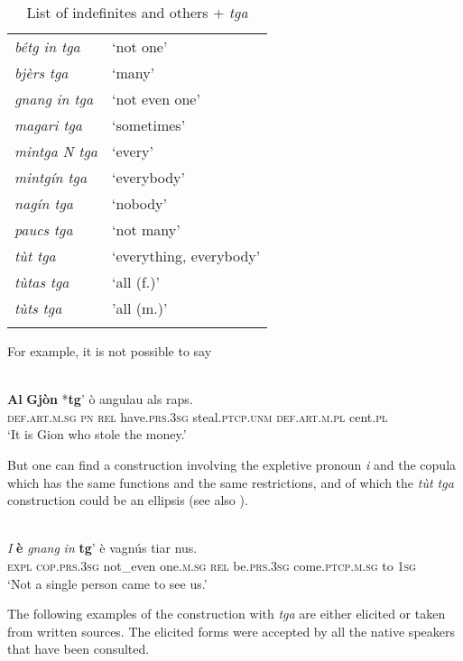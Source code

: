 \begin{table}
	\caption{List of indefinites and others + \textit{tga}}
	\label{indefinitetga}
	\begin{tabular}{ll}
		\lsptoprule
				\textit{bétg in tga} & `not one'\\
		\textit{bjèrs tga} & `many'\\
		\textit{gnang in tga} & `not even one'\\
		\textit{magari tga} & `sometimes'\\
		\textit{mintga N tga} & `every'\\
		\textit{mintgín tga} & `everybody'\\
		\textit{nagín tga} & `nobody'\\
		\textit{paucs tga} & `not many'\\
		\textit{tùt tga} & `everything, everybody'\\
		\textit{tùtas tga} & `all (f.)'\\
		\textit{tùts tga} & 'all (m.)'\\
		\lspbottomrule
	\end{tabular}
\end{table}

For example, it is not possible to say

\ea
{}\\
\gll \textbf{Al} \textbf{Gjòn} *\textbf{tg}' ò angulau als raps.\\
\textsc{def.art.m.sg} \textsc{pn} \textsc{rel} have.\textsc{prs.3sg} steal.\textsc{ptcp.unm} \textsc{def.art.m.pl} cent.\textsc{pl}\\
\glt `It is Gion who stole the money.'
\z

But one can find a construction involving the expletive pronoun \textit{i} and the copula which has the same functions and the same restrictions, and of which the \textit{tùt tga} construction could be an ellipsis (see also  \citet[201]{Linder1987}).

\ea
{}\\
\gll \textit{I} \textbf{è} \textit{gnang} \textit{in} \textbf{tg}' è vagnús tiar nus.\\
\textsc{expl} \textsc{cop.prs.3sg} not\_even one.\textsc{m.sg} \textsc{rel} be.\textsc{prs.3sg} come.\textsc{ptcp.m.sg} to \textsc{1sg}\\
\glt `Not a single person came to see us.'
\z

The following examples of the construction with \textit{tga} are either elicited or taken from written sources. The elicited forms were accepted by all the native speakers that have been consulted.

